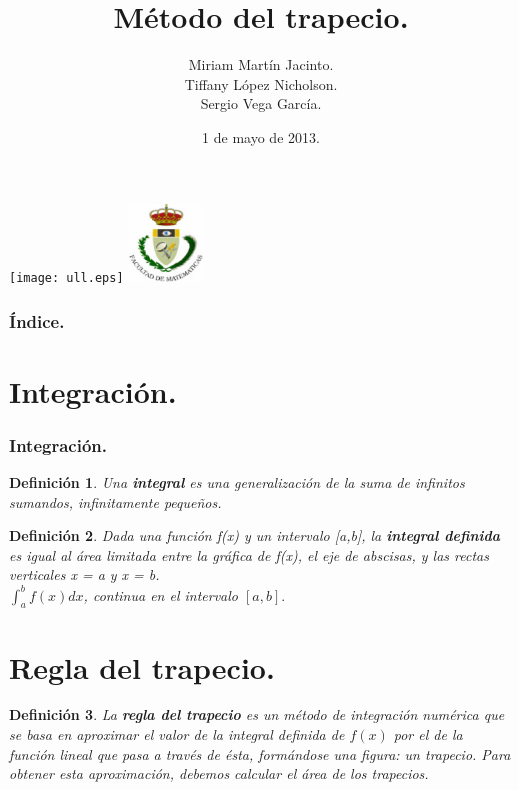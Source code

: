 \documentclass{beamer}
\title[Integración]{Método del trapecio.}
\author[Grupo-2D]{Miriam Martín Jacinto.\\Tiffany López Nicholson.\\Sergio Vega García.}
\date[01/05/2013]{1 de mayo de 2013.}
\newtheorem{definicion}{Definición}
\begin{document}
  \begin{frame}
    \texttt{[image: ull.eps]}
    \hspace{7cm}
    \includegraphics[width=0.15\textwidth]{fmatesc.eps}
    \titlepage
  \end{frame}
  \begin{frame}
    \frametitle{Índice.}
    \tableofcontents[pausesections]
  \end{frame}
  \section{Integración.}
  \begin{frame}
    \frametitle{Integración.}
      \begin{definicion}
	Una \textbf{integral} es una generalización de la suma de infinitos sumandos, infinitamente pequeños.
      \end{definicion}
	
      \begin{definicion}
	Dada una función f(x) y un intervalo [a,b], la \textbf{integral definida} es igual al área limitada entre la gráfica de f(x), el eje de abscisas, y las rectas verticales x = a y x = b.\\
	$\int_{a}^{b} f(x) dx$, continua en el intervalo $[a, b].$
      \end{definicion}
  \end{frame}
  \section{Regla del trapecio.}
  \begin{frame}
    \begin{definicion}
      La \textbf{regla del trapecio} es un método de integración numérica que se basa en aproximar el valor de la integral definida de $f(x)$ por el de la función lineal que pasa a través de ésta, formándose una figura: un trapecio. Para obtener esta aproximación, debemos calcular el área de los trapecios.
    \end{definicion}
  \end{frame}
\end{document}
